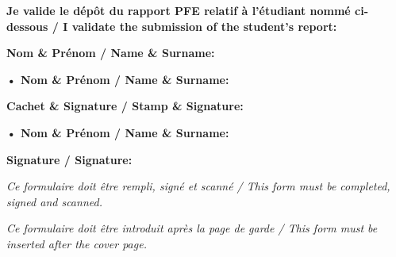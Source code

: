 

\thispagestyle{empty}


\noindent \textbf{Je valide le dépôt du rapport PFE relatif à l’étudiant nommé ci-dessous / I validate the submission of the student’s report:}

\vspace{1cm}

\noindent \textbf{Nom \& Prénom / Name \& Surname:} \dotfill

\vspace{1.5cm}

\begin{tcolorbox}[colback=black!5!white, colframe=black, title=Encadrant Entreprise / Business site Supervisor, width=\textwidth, boxrule=0.5pt]
\textbf{• Nom \& Prénom / Name \& Surname:} \dotfill

\vspace{1cm}

\textbf{Cachet \& Signature / Stamp \& Signature:}

\vspace{2cm} %
\end{tcolorbox}

\vspace{1.5cm}

\begin{tcolorbox}[colback=black!5!white, colframe=black, title=Encadrant Académique / Academic Supervisor, width=\textwidth, boxrule=0.5pt]
\textbf{• Nom \& Prénom / Name \& Surname:} \dotfill

\vspace{1cm}

\textbf{Signature / Signature:}

\vspace{2cm} %
\end{tcolorbox}

\vspace{2cm}

\noindent \textit{Ce formulaire doit être rempli, signé et scanné / This form must be completed, signed and scanned.}

\vspace{0.2cm}

\noindent \textit{Ce formulaire doit être introduit après la page de garde / This form must be inserted after the cover page.}

\vfill
